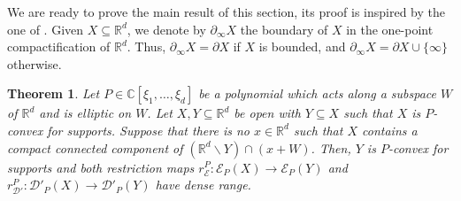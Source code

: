 \documentclass[12pt]{amsart}
\newcommand{\R}{\mathbb{R}}
\newcommand{\C}{\mathbb{C}}
\newtheorem{theorem}{Theorem}[section]
\theoremstyle{definition}
\theoremstyle{remark}
\numberwithin{equation}{section}
\begin{document}
We are ready to prove the main result of this section,
its proof is inspired by the one of  \cite[Theorem 1]{Kalmes21}. Given $X \subseteq \R^d$, we denote by $\partial_\infty X$  the boundary of $X$ in the one-point compactification of $\R^d$. Thus, $\partial_\infty X=\partial X$ if $X$ is bounded, and $\partial_\infty X=\partial X\cup\{\infty\}$ otherwise. 
\begin{theorem}\label{theo: Runge for subspace elliptic}
	Let $P\in\C[\xi_1,\ldots,\xi_d]$ be a polynomial which acts along a subspace $W$ of $\R^d$ and is elliptic on $W$. Let $X,Y \subseteq\R^d$ be open with $Y \subseteq X$ such that $X$ is $P$-convex for supports. Suppose that there is no $x\in\R^d$ such that $X$ contains a compact connected component of $(\R^d\backslash Y)\cap (x+W)$. Then, $Y$ is $P$-convex for supports and both restriction maps
	$r_\mathscr{E}^P: \mathscr{E}_P(X)\rightarrow\mathscr{E}_P(Y)$ and $r_{\mathscr{D}'}^P:\mathscr{D}'_P(X)\rightarrow\mathscr{D}'_P(Y)$
	have dense range.
\end{theorem}
\end{document}
